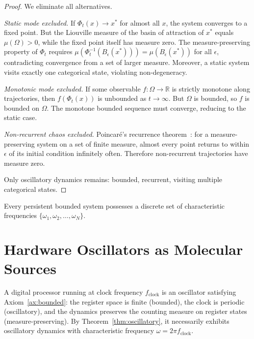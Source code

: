 \begin{proof}
We eliminate all alternatives.

\emph{Static mode excluded.} If $\Phi_t(x) \to x^*$ for almost all $x$, the system converges to a fixed point. But the Liouville measure of the basin of attraction of $x^*$ equals $\mu(\Omega) > 0$, while the fixed point itself has measure zero. The measure-preserving property of $\Phi_t$ requires $\mu(\Phi_t^{-1}(B_\epsilon(x^*))) = \mu(B_\epsilon(x^*))$ for all $\epsilon$, contradicting convergence from a set of larger measure. Moreover, a static system visits exactly one categorical state, violating non-degeneracy.

\emph{Monotonic mode excluded.} If some observable $f : \Omega \to \mathbb{R}$ is strictly monotone along trajectories, then $f(\Phi_t(x))$ is unbounded as $t \to \infty$. But $\Omega$ is bounded, so $f$ is bounded on $\Omega$. The monotone bounded sequence must converge, reducing to the static case.

\emph{Non-recurrent chaos excluded.} Poincar\'{e}'s recurrence theorem~\cite{poincare1890}: for a measure-preserving system on a set of finite measure, almost every point returns to within $\epsilon$ of its initial condition infinitely often. Therefore non-recurrent trajectories have measure zero.

Only oscillatory dynamics remains: bounded, recurrent, visiting multiple categorical states.
\end{proof}

\begin{corollary}
\label{cor:spectrum}
Every persistent bounded system possesses a discrete set of characteristic frequencies $\{\omega_1, \omega_2, \ldots, \omega_N\}$.
\end{corollary}

\section{Hardware Oscillators as Molecular Sources}
\label{sec:hardware}

A digital processor running at clock frequency $f_{\mathrm{clock}}$ is an oscillator satisfying Axiom~\ref{ax:bounded}: the register space is finite (bounded), the clock is periodic (oscillatory), and the dynamics preserves the counting measure on register states (measure-preserving). By Theorem~\ref{thm:oscillatory}, it necessarily exhibits oscillatory dynamics with characteristic frequency $\omega = 2\pi f_{\mathrm{clock}}$.

